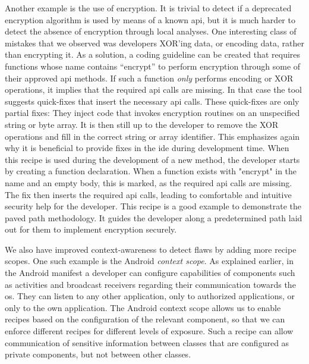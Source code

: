 Another example is the use of encryption.
It is trivial to detect if a deprecated encryption algorithm is used by means of a known \gls{api}, but it is much harder to detect the absence of encryption through local analyses.
One interesting class of mistakes that we observed was developers XOR’ing data, or encoding data, rather than encrypting it.
As a solution, a coding guideline can be created that requires functions whose name contains “encrypt” to perform encryption through some of their approved \gls{api} methods.
If such a function \emph{only} performs encoding or XOR operations, it implies that the required \gls{api} calls are missing.
In that case the tool suggests quick-fixes that insert the necessary \gls{api} calls.
These quick-fixes are only partial fixes: They inject code that invokes encryption routines on an unspecified string or byte array.
It is then still up to the developer to remove the XOR operations and fill in the correct string or array identifier.
This emphasizes again why it is beneficial to provide fixes in the \gls{ide} during development time.
When this recipe is used during the development of a new method, the developer starts by creating a function declaration.
When a function exists with "encrypt" in the name and an empty body, this is marked, as the required \gls{api} calls are missing.
The fix then inserts the required \gls{api} calls, leading to comfortable and intuitive security help for the developer.
This recipe is a good example to demonstrate the paved path methodology.
It guides the developer along a predetermined path laid out for them to implement encryption securely.

We also have improved context-awareness to detect flaws by adding more recipe scopes.
One such example is the Android \emph{context scope}.
As explained earlier, in the Android manifest a developer can configure capabilities of components such as activities and broadcast receivers regarding their communication towards the \gls{os}.
They can listen to any other application, only to authorized applications, or only to the own application.
The Android context scope allows us to enable recipes based on the configuration of the relevant component, so that we can enforce different recipes for different levels of exposure.
Such a recipe can allow communication of sensitive information between classes that are configured as private components, but not between other classes.

